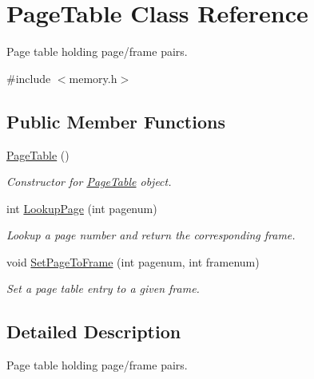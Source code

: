 \hypertarget{classPageTable}{}\section{Page\+Table Class Reference}
\label{classPageTable}


Page table holding page/frame pairs.  




{\ttfamily \#include $<$memory.\+h$>$}

\subsection*{Public Member Functions}
\begin{DoxyCompactItemize}
\item 
\hyperlink{classPageTable_a75c92e794fd3f5397d2499d54dac22c9}{Page\+Table} ()\hypertarget{classPageTable_a75c92e794fd3f5397d2499d54dac22c9}{}\label{classPageTable_a75c92e794fd3f5397d2499d54dac22c9}

\begin{DoxyCompactList}\small\item\em Constructor for \hyperlink{classPageTable}{Page\+Table} object. \end{DoxyCompactList}\item 
int \hyperlink{classPageTable_a2590af90445c76b97420da95cf7210ec}{Lookup\+Page} (int pagenum)
\begin{DoxyCompactList}\small\item\em Lookup a page number and return the corresponding frame. \end{DoxyCompactList}\item 
void \hyperlink{classPageTable_ac961a37f5dde09c3addce2fcd118f24d}{Set\+Page\+To\+Frame} (int pagenum, int framenum)\hypertarget{classPageTable_ac961a37f5dde09c3addce2fcd118f24d}{}\label{classPageTable_ac961a37f5dde09c3addce2fcd118f24d}

\begin{DoxyCompactList}\small\item\em Set a page table entry to a given frame. \end{DoxyCompactList}\end{DoxyCompactItemize}


\subsection{Detailed Description}
Page table holding page/frame pairs. 

